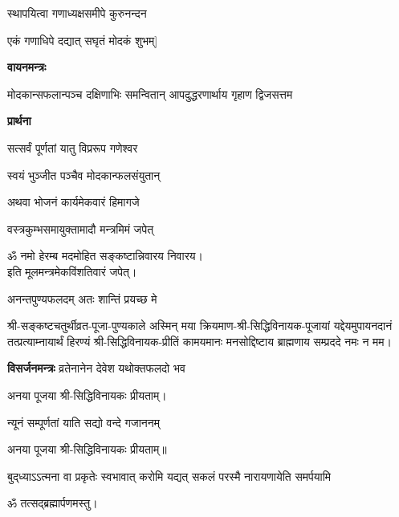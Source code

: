 \begin{center}
\twolineshloka*
{[अथैकविंशतिं गृह्य मोदकान् घृतपाचितान्}
{स्थापयित्वा गणाध्यक्षसमीपे कुरुनन्दन}

{एकं गणाधिपे दद्यात् सघृतं मोदकं शुभम्]}

\centerline{\textbf{वायनमन्त्रः}}

{मोदकान्सफलान्पञ्च दक्षिणाभिः समन्वितान्}
{आपदुद्धरणार्थाय गृहाण द्विजसत्तम}

\centerline{\textbf{प्रार्थना}}

{सत्सर्वं पूर्णतां यातु विप्ररूप गणेश्वर}

{स्वयं भुञ्जीत पञ्चैव मोदकान्फलसंयुतान्}

{अथवा भोजनं कार्यमेकवारं हिमागजे}

{वस्त्रकुम्भसमायुक्तामादौ मन्त्रमिमं जपेत्}

ॐ नमो हेरम्ब मदमोहित सङ्कष्टान्निवारय निवारय।\\
इति मूलमन्त्रमेकविंशतिवारं जपेत्।
\medskip


{अनन्तपुण्यफलदम् अतः शान्तिं प्रयच्छ मे}

श्री-सङ्कष्टचतुर्थीव्रत-पूजा-पुण्यकाले अस्मिन् मया क्रियमाण-श्री-सिद्धिविनायक-पूजायां
यद्देयमुपायनदानं तत्प्रत्याम्नायार्थं हिरण्यं श्री-सिद्धिविनायक-प्रीतिं
कामयमानः मनसोद्दिष्टाय ब्राह्मणाय सम्प्रददे नमः न मम।

\textbf{विसर्जनमन्त्रः}
{व्रतेनानेन देवेश यथोक्तफलदो भव}

अनया पूजया श्री-सिद्धिविनायकः प्रीयताम्। 


{न्यूनं सम्पूर्णतां याति सद्यो वन्दे गजाननम्} 

अनया पूजया श्री-सिद्धिविनायकः प्रीयताम्॥ 

{बुद्‌ध्याऽऽत्मना वा प्रकृतेः स्वभावात्}
{करोमि यद्यत् सकलं परस्मै}
{नारायणायेति समर्पयामि}

ॐ तत्सद्ब्रह्मार्पणमस्तु।

\end{center}


